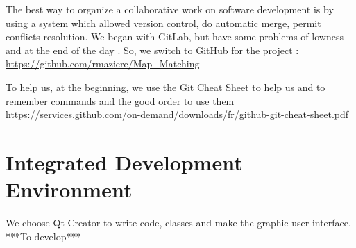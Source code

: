 The best way to organize a collaborative work on software development is by using a system which allowed version control, do automatic merge, permit conflicts resolution.
We began with GitLab, but have some problems of lowness and at the end of the day .
So, we switch to GitHub for the project : \url{https://github.com/rmaziere/Map_Matching}

To help us, at the beginning, we use the Git Cheat Sheet to help us and to remember commands and the good order to use them \url{https://services.github.com/on-demand/downloads/fr/github-git-cheat-sheet.pdf}

\section{Integrated Development Environment}

We choose Qt Creator to write code, classes and make the graphic user interface.
***To develop***